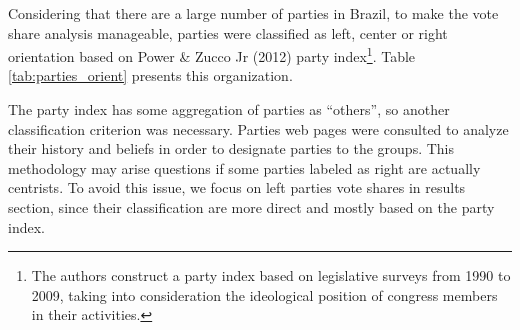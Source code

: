 \documentclass[
  12pt,
]{article}
\begin{document}
Considering that there are a large number of parties in Brazil, to make
the vote share analysis manageable, parties were classified as left,
center or right orientation based on Power \& Zucco Jr (2012) party
index\footnote{The authors construct a party index based on legislative
  surveys from 1990 to 2009, taking into consideration the ideological
  position of congress members in their activities.}. Table
\ref{tab:parties_orient} presents this organization.

\begin{table}[H]

\caption{\label{tab:parties_orient}Party classification according to orientation (left, center or right)}
\centering
{}
\end{table}

The party index has some aggregation of parties as ``others'', so
another classification criterion was necessary. Parties web pages were
consulted to analyze their history and beliefs in order to designate
parties to the groups. This methodology may arise questions if some
parties labeled as right are actually centrists. To avoid this issue, we
focus on left parties vote shares in results section, since their
classification are more direct and mostly based on the party index.
\end{document}
